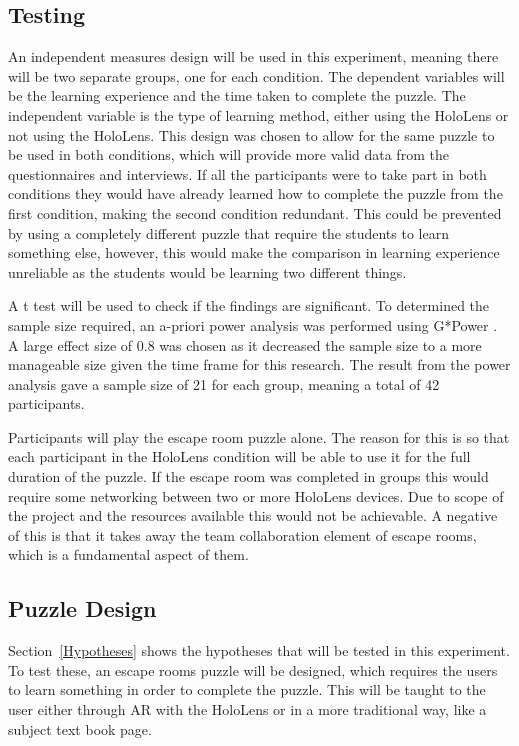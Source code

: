 \documentclass[journal]{IEEEtran}
\begin{document}
\subsection{Testing}
An independent measures design will be used in this experiment, meaning there will be two separate groups, one for each condition. The dependent variables will be the learning experience and the time taken to complete the puzzle. The independent variable is the type of learning method, either using the HoloLens or not using the HoloLens. This design was chosen to allow for the same puzzle to be used in both conditions, which will provide more valid data from the questionnaires and interviews. If all the participants were to take part in both conditions they would have already learned how to complete the puzzle from the first condition, making the second condition redundant. This could be prevented by using a completely different puzzle that require the students to learn something else, however, this would make the comparison in learning experience unreliable as the students would be learning two different things. 

A t test will be used to check if the findings are significant. To determined the sample size required, an a-priori power analysis was performed using G*Power \cite{noauthor_universitat_nodate}. A large effect size of 0.8 was chosen as it decreased the sample size to a more manageable size given the time frame for this research. The result from the power analysis gave a sample size of 21 for each group, meaning a total of 42 participants.  

Participants will play the escape room puzzle alone. The reason for this is so that each participant in the HoloLens condition will be able to use it for the full duration of the puzzle. If the escape room was completed in groups this would require some networking between two or more HoloLens devices. Due to scope of the project and the resources available this would not be achievable. A negative of this is that it takes away the team collaboration element of escape rooms, which is a fundamental aspect of them. 

\subsection{Puzzle Design}
Section~\ref{Hypotheses} shows the hypotheses that will be tested in this experiment. To test these, an escape rooms puzzle will be designed, which requires the users to learn something in order to complete the puzzle. This will be taught to the user either through AR with the HoloLens or in a more traditional way, like a subject text book page. 
\end{document}
